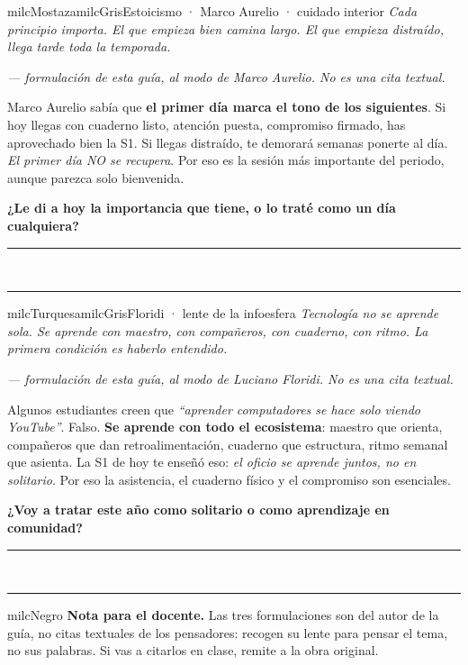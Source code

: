 \documentclass[11pt,letterpaper]{article}
\newcommand{\linead}[1]{\noindent\color{milcLinea}\rule{#1}{0.5pt}\color{milcNegro}}
\begin{document}
\begin{softbox}{milcMostaza}{milcGris}{Estoicismo · Marco Aurelio · cuidado interior}
\textit{Cada principio importa. El que empieza bien camina largo. El que empieza distraído, llega tarde toda la temporada.}

{\footnotesize\itshape\color{milcNegro!70}--- formulación de esta guía, al modo de Marco Aurelio. No es una cita textual.}

Marco Aurelio sabía que \textbf{el primer día marca el tono de los siguientes}. Si hoy llegas con cuaderno listo, atención puesta, compromiso firmado, has aprovechado bien la S1. Si llegas distraído, te demorará semanas ponerte al día. \emph{El primer día NO se recupera}. Por eso es la sesión más importante del periodo, aunque parezca solo bienvenida.

\textbf{¿Le di a hoy la importancia que tiene, o lo traté como un día cualquiera?}
\end{softbox}
\linead{\linewidth}\\[1mm]
\linead{\linewidth}

\begin{softbox}{milcTurquesa}{milcGris}{Floridi · lente de la infoesfera}
\textit{Tecnología no se aprende sola. Se aprende con maestro, con compañeros, con cuaderno, con ritmo. La primera condición es haberlo entendido.}

{\footnotesize\itshape\color{milcNegro!70}--- formulación de esta guía, al modo de Luciano Floridi. No es una cita textual.}

Algunos estudiantes creen que \emph{``aprender computadores se hace solo viendo YouTube''}. Falso. \textbf{Se aprende con todo el ecosistema}: maestro que orienta, compañeros que dan retroalimentación, cuaderno que estructura, ritmo semanal que asienta. La S1 de hoy te enseñó eso: \emph{el oficio se aprende juntos, no en solitario}. Por eso la asistencia, el cuaderno físico y el compromiso son esenciales.

\textbf{¿Voy a tratar este año como solitario o como aprendizaje en comunidad?}
\end{softbox}
\linead{\linewidth}\\[1mm]
\linead{\linewidth}

\begin{infoband}{milcNegro}
\textbf{Nota para el docente.} Las tres formulaciones son del autor de la guía, no citas textuales de los pensadores: recogen su lente para pensar el tema, no sus palabras. Si vas a citarlos en clase, remite a la obra original.
\end{infoband}
\end{document}
